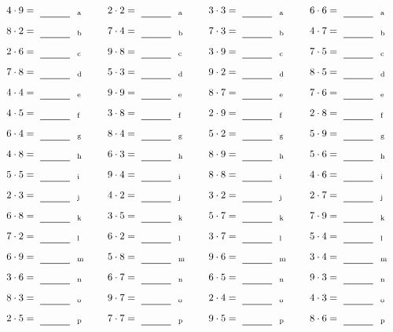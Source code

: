 \documentclass
[
  draft    = true,
  fontsize = 11pt,
  parskip  = half-
]
{scrartcl}
\begin{document}
\par\vfill\par
\begin{align*}
    \pline{4\cdot9}&=\rline{a}
  & \pline{2\cdot2}&=\rline{a}
  & \pline{3\cdot3}&=\rline{a}
  & \pline{6\cdot6}&=\rline{a} \\[1ex]
    \pline{8\cdot2}&=\rline{b}
  & \pline{7\cdot4}&=\rline{b}
  & \pline{7\cdot3}&=\rline{b}
  & \pline{4\cdot7}&=\rline{b} \\[1ex]
    \pline{2\cdot6}&=\rline{c}
  & \pline{9\cdot8}&=\rline{c}
  & \pline{3\cdot9}&=\rline{c}
  & \pline{7\cdot5}&=\rline{c} \\[1ex]
    \pline{7\cdot8}&=\rline{d}
  & \pline{5\cdot3}&=\rline{d}
  & \pline{9\cdot2}&=\rline{d}
  & \pline{8\cdot5}&=\rline{d} \\[1ex]
    \pline{4\cdot4}&=\rline{e}
  & \pline{9\cdot9}&=\rline{e}
  & \pline{8\cdot7}&=\rline{e}
  & \pline{7\cdot6}&=\rline{e} \\[1ex]
    \pline{4\cdot5}&=\rline{f}
  & \pline{3\cdot8}&=\rline{f}
  & \pline{2\cdot9}&=\rline{f}
  & \pline{2\cdot8}&=\rline{f} \\[1ex]
    \pline{6\cdot4}&=\rline{g}
  & \pline{8\cdot4}&=\rline{g}
  & \pline{5\cdot2}&=\rline{g}
  & \pline{5\cdot9}&=\rline{g} \\[1ex]
    \pline{4\cdot8}&=\rline{h}
  & \pline{6\cdot3}&=\rline{h}
  & \pline{8\cdot9}&=\rline{h}
  & \pline{5\cdot6}&=\rline{h} \\[1ex]
    \pline{5\cdot5}&=\rline{i}
  & \pline{9\cdot4}&=\rline{i}
  & \pline{8\cdot8}&=\rline{i}
  & \pline{4\cdot6}&=\rline{i} \\[1ex]
    \pline{2\cdot3}&=\rline{j}
  & \pline{4\cdot2}&=\rline{j}
  & \pline{3\cdot2}&=\rline{j}
  & \pline{2\cdot7}&=\rline{j} \\[1ex]
    \pline{6\cdot8}&=\rline{k}
  & \pline{3\cdot5}&=\rline{k}
  & \pline{5\cdot7}&=\rline{k}
  & \pline{7\cdot9}&=\rline{k} \\[1ex]
    \pline{7\cdot2}&=\rline{l}
  & \pline{6\cdot2}&=\rline{l}
  & \pline{3\cdot7}&=\rline{l}
  & \pline{5\cdot4}&=\rline{l} \\[1ex]
    \pline{6\cdot9}&=\rline{m}
  & \pline{5\cdot8}&=\rline{m}
  & \pline{9\cdot6}&=\rline{m}
  & \pline{3\cdot4}&=\rline{m} \\[1ex]
    \pline{3\cdot6}&=\rline{n}
  & \pline{6\cdot7}&=\rline{n}
  & \pline{6\cdot5}&=\rline{n}
  & \pline{9\cdot3}&=\rline{n} \\[1ex]
    \pline{8\cdot3}&=\rline{o}
  & \pline{9\cdot7}&=\rline{o}
  & \pline{2\cdot4}&=\rline{o}
  & \pline{4\cdot3}&=\rline{o} \\[1ex]
    \pline{2\cdot5}&=\rline{p}
  & \pline{7\cdot7}&=\rline{p}
  & \pline{9\cdot5}&=\rline{p}
  & \pline{8\cdot6}&=\rline{p}
\end{align*}
\end{document}
